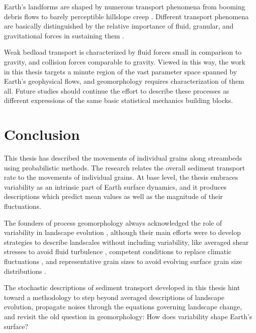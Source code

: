 Earth's landforms are shaped by numerous transport phenomena from booming debris flows \citep{Iverson1997} to barely perceptible hillslope creep \citep{Deshpande2021}.
Different transport phenomena are basically distinguished by the relative importance of fluid, granular, and gravitational forces in sustaining them \citep{Jerolmack2019}.

Weak bedload transport is characterized by fluid forces small in comparison to gravity, and collision forces comparable to gravity.
Viewed in this way, the work in this thesis targets a minute region of the vast parameter space spanned by Earth's geophysical flows, and geomorphology requires characterization of them all.
Future studies should continue the effort \citep[e.g.][]{Furbish2021a} to describe these processes as different expressions of the same basic statistical mechanics building blocks.

\section{Conclusion}

This thesis has described the movements of individual grains along streambeds using probabilistic methods.
The research relates the overall sediment transport rate to the movements of individual grains.
At base level, the thesis embraces variability as an intrinsic part of Earth surface dynamics, and it produces descriptions which predict mean values as well as the magnitude of their fluctuations.

The founders of process geomorphology always acknowledged the role of variability in landscape evolution \citep{Horton1945,Strahler1952,Langbein1964}, although their main efforts were to develop strategies to describe landscales without including variability, like averaged shear stresses to avoid fluid turbulence \citep{MeyerPeter1948,Bagnold1954}, competent conditions to replace climatic fluctuations \citep{Wolman1959,Wolman1978}, and representative grain sizes to avoid evolving surface grain size distributions \citep{Parker1982,Andrews1983}.

The stochastic descriptions of sediment transport developed in this thesis hint toward a methodology to step beyond averaged descriptions of landscape evolution, propagate noises through the equations governing landscape change, and revisit the old question in geomorphology: How does variability shape Earth's surface?

\endinput

Its closest neighbours may be rarefied hillslope transport, where solitary grains tumble down hillslopes \citep{Williams2021}, and intense bedload transport, where particles creep downstream in a dense granular flow, supported by collisions with other moving grains \citep{Frey2014}. These phenomena differ only by viscosity or density, not mechanically. 



